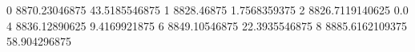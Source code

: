 0 8870.23046875 43.5185546875
1 8828.46875 1.7568359375
2 8826.7119140625 0.0
4 8836.12890625 9.4169921875
6 8849.10546875 22.3935546875
8 8885.6162109375 58.904296875
